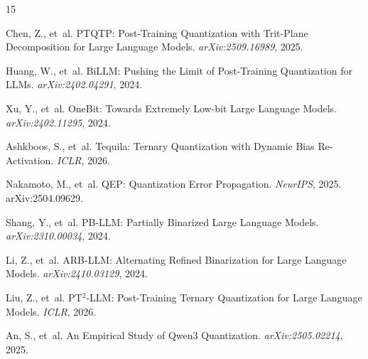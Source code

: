 \documentclass[10pt,a4paper]{article}
\begin{document}
\begin{thebibliography}{15}

Chen, Z., et~al.
\newblock PTQTP: Post-Training Quantization with Trit-Plane Decomposition for Large Language Models.
\newblock \textit{arXiv:2509.16989}, 2025.

Huang, W., et~al.
\newblock BiLLM: Pushing the Limit of Post-Training Quantization for LLMs.
\newblock \textit{arXiv:2402.04291}, 2024.

Xu, Y., et~al.
\newblock OneBit: Towards Extremely Low-bit Large Language Models.
\newblock \textit{arXiv:2402.11295}, 2024.

Ashkboos, S., et~al.
\newblock Tequila: Ternary Quantization with Dynamic Bias Re-Activation.
\newblock \textit{ICLR}, 2026.

Nakamoto, M., et~al.
\newblock QEP: Quantization Error Propagation.
\newblock \textit{NeurIPS}, 2025. arXiv:2504.09629.

Shang, Y., et~al.
\newblock PB-LLM: Partially Binarized Large Language Models.
\newblock \textit{arXiv:2310.00034}, 2024.

Li, Z., et~al.
\newblock ARB-LLM: Alternating Refined Binarization for Large Language Models.
\newblock \textit{arXiv:2410.03129}, 2024.

Liu, Z., et~al.
\newblock PT$^2$-LLM: Post-Training Ternary Quantization for Large Language Models.
\newblock \textit{ICLR}, 2026.

An, S., et~al.
\newblock An Empirical Study of Qwen3 Quantization.
\newblock \textit{arXiv:2505.02214}, 2025.

\end{thebibliography}
\end{document}
